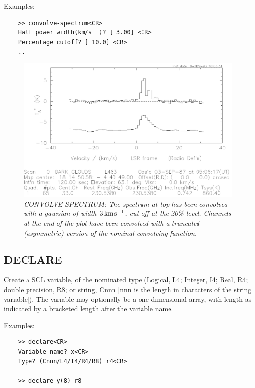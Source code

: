 \documentclass[11pt,twoside]{report}
\newcommand{\kms}{{\rm\,km\,s^{-1}}}
\begin{document}
Examples:
\begin{verbatim}
    >> convolve-spectrum<CR>
    Half power width(km/s  )? [ 3.00] <CR>
    Percentage cutoff? [ 10.0] <CR>
    ..
\end{verbatim}

\begin{figure}[htbp]
\begin{center}
\includegraphics[scale=0.65]{convolve}
\protect\parbox{5.5in}
{\caption[CONVOLVE]
{\sl
CONVOLVE-SPECTRUM: The spectrum at top has been convolved with a gaussian
of width $3\kms$, cut off at the 20\% level. Channels at the end of the
plot have been convolved with a truncated (asymmetric) version of the
nominal convolving function.
\label{CONVOLVE}
}
}
\end{center}
\end{figure}

\subsection{DECLARE}  

Create a SCL variable, of the nominated type (Logical, L4; Integer, I4;
Real, R4; double precision, R8; or string, Cnnn [nnn is the length in characters
of the string variable]). The variable may
optionally be a one-dimensional array, with length as indicated by a
bracketed length after the variable name.

Examples:
\begin{verbatim}
    >> declare<CR>
    Variable name? x<CR>
    Type? (Cnnn/L4/I4/R4/R8) r4<CR>

    >> declare y(8) r8
\end{verbatim}
\end{document}
